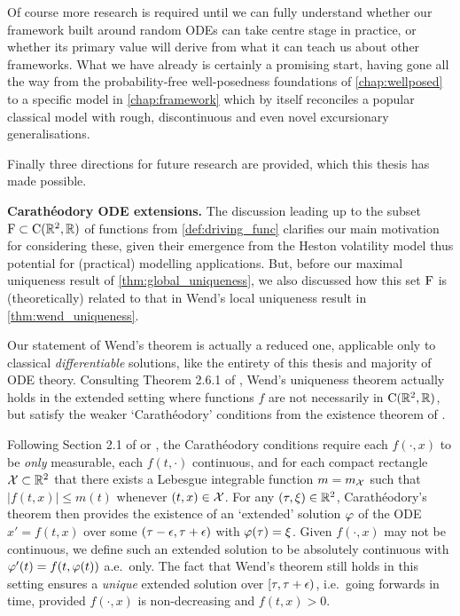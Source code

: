 Of course more research is required until we can fully understand whether our framework built around random ODEs can take centre stage in practice, or whether its primary value will derive from what it can teach us about other frameworks. What we have already is certainly a promising start, having gone all the way from the probability-free well-posedness foundations of \autoref{chap:wellposed} to a specific model in \autoref{chap:framework} which by itself reconciles a popular classical model with rough, discontinuous and even novel excursionary generalisations.

Finally three directions for future research are provided, which this thesis has made possible.

\vspace{3mm}\textbf{Carath\'eodory ODE extensions.} The discussion leading up to the subset $\mathrm{F}\subset\mathrm{C}(\mathbb{R}^2,\mathbb{R})$ of functions from \autoref{def:driving_func} clarifies our main motivation for considering these, given their emergence from the Heston volatility model thus potential for (practical) modelling applications. But, before our maximal uniqueness result of \autoref{thm:global_uniqueness}, we also discussed how this set $\mathrm{F}$ is (theoretically) related to that in Wend's local uniqueness result in \autoref{thm:wend_uniqueness}.

Our statement of Wend's theorem is actually a reduced one, applicable only to classical \emph{differentiable} solutions, like the entirety of this thesis and majority of ODE theory. Consulting Theorem 2.6.1 of \cite{agarwal_1993}, Wend's uniqueness theorem actually holds in the extended setting where functions $f$ are not necessarily in $\mathrm{C}(\mathbb{R}^2,\mathbb{R})$, but satisfy the weaker `Carath\'eodory' conditions from the existence theorem of \cite{caratheodory_1927}.

Following Section 2.1 of \cite{coddington_1955} or \cite{agarwal_1993}, the Carath\'eodory conditions require each $f(\cdot,x)$ to be \emph{only} measurable, each $f(t,\cdot)$ continuous, and for each compact rectangle $\mathcal{X}\subset\mathbb{R}^2$ that there exists a Lebesgue integrable function $m=m_{\mathcal{X}}$ such that $|f(t,x)|\le m(t)$ whenever $(t,x)\in\mathcal{X}$. For any $(\tau,\xi)\in\mathbb{R}^2$, Carath\'eodory's theorem then provides the existence of an `extended' solution $\varphi$ of the ODE $x'=f(t,x)$ over some $(\tau-\epsilon,\tau+\epsilon)$ with $\varphi(\tau)=\xi$. Given $f(\cdot,x)$ may not be continuous, we define such an extended solution to be absolutely continuous with $\varphi'(t)=f(t,\varphi(t))$ a.e.~only. The fact that Wend's theorem still holds in this setting ensures a \emph{unique} extended solution over $[\tau,\tau+\epsilon)$, i.e.~going forwards in time, provided $f(\cdot,x)$ is non-decreasing and $f(t,x)>0$.

